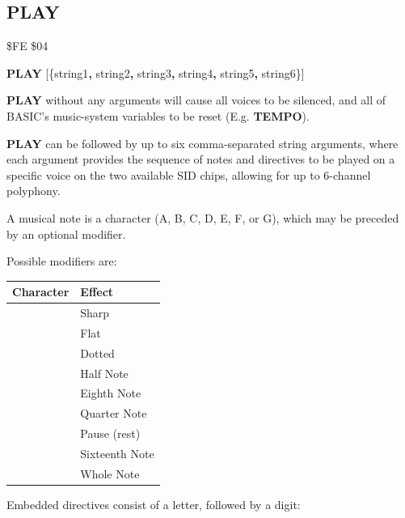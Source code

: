 \subsection{PLAY}
\begin{description}[leftmargin=2cm,style=nextline]
\item [Token:] \$FE \$04
\item [Format:] {\bf PLAY} [\{string1{\bf,} string2{\bf,} string3{\bf,}
		string4{\bf,} string5{\bf,} string6\}]
\item [Usage:] {\bf PLAY} without any arguments will cause all voices to be silenced,
               and all of BASIC's music-system variables to be reset (E.g. {\bf TEMPO}).

               {\bf PLAY} can be followed by up to six comma-separated string arguments,
               where each argument provides the sequence of notes and directives to be played on
               a specific voice on the two available SID chips, allowing for up to 6-channel polyphony.

               A musical note is a character (A, B, C, D, E, F, or G),
               which may be preceded by an optional modifier.

               Possible modifiers are:
\begin{center}
{\setlength{\tabcolsep}{1mm}
\begin{tabular}{*{1}{|l}|l|}
\hline
{\bf Character}  & {\bf Effect} \\
\hline
\screentext{\#} & Sharp \\
\screentext{\$} & Flat \\
  & Dotted \\
  & Half Note \\
  & Eighth Note \\
  & Quarter Note \\
  & Pause (rest) \\
  & Sixteenth Note \\
  & Whole Note \\
\hline
\end{tabular}
}
\end{center}

Embedded directives consist of a letter, followed by a digit:


\end{description}
